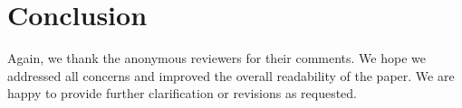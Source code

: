\documentclass{letter}
\begin{document}
\section{Conclusion}

Again, we thank the anonymous reviewers for their comments. We hope we addressed all concerns and improved the overall readability of the paper. We are happy to provide further clarification or revisions as requested.





%
%
\end{document}
